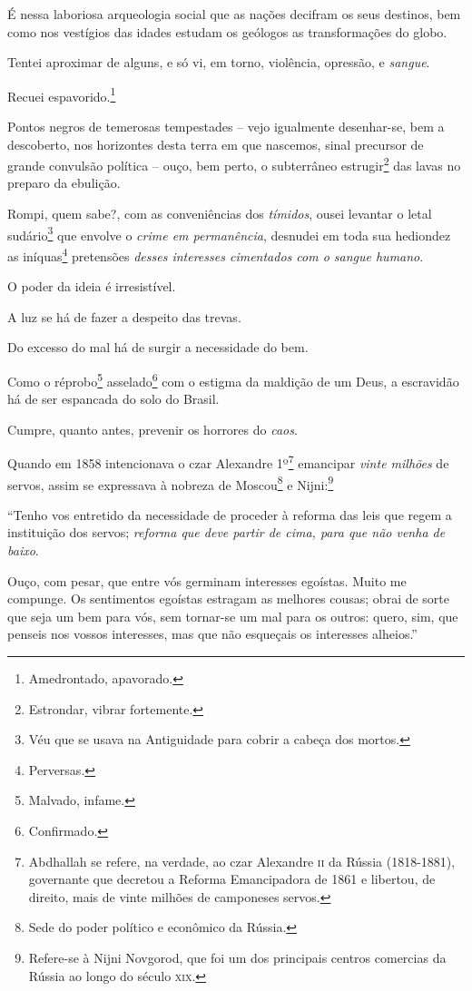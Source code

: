 É nessa laboriosa arqueologia social que as nações decifram os seus
destinos, bem como nos vestígios das idades estudam os geólogos as
transformações do globo.

Tentei aproximar de alguns, e só vi, em torno, violência, opressão, e
\emph{sangue}.

Recuei espavorido.\footnote{Amedrontado, apavorado.}

Pontos negros de temerosas tempestades -- vejo igualmente desenhar-se,
bem a descoberto, nos horizontes desta terra em que nascemos, sinal
precursor de grande convulsão política -- ouço, bem perto, o subterrâneo
estrugir\footnote{Estrondar, vibrar fortemente.} das lavas no preparo
da ebulição.

Rompi, quem sabe?, com as conveniências dos \emph{tímidos}, ousei
levantar o letal sudário\footnote{Véu que se usava na Antiguidade para
  cobrir a cabeça dos mortos.} que envolve o \emph{crime em
permanência}, desnudei em toda sua hediondez as iníquas\footnote{
  Perversas.} pretensões \emph{desses interesses cimentados com o sangue
humano}.

O poder da ideia é irresistível.

A luz se há de fazer a despeito das trevas.

Do excesso do mal há de surgir a necessidade do bem.

Como o réprobo\footnote{Malvado, infame.} asselado\footnote{
  Confirmado.} com o estigma da maldição de um Deus, a escravidão há de
ser espancada do solo do Brasil.

Cumpre, quanto antes, prevenir os horrores do \emph{caos}.

Quando em 1858 intencionava o czar Alexandre 1º\footnote{
  Abdhallah se refere, na verdade, ao czar Alexandre \textsc{ii} da Rússia
  (1818-1881), governante que decretou a Reforma Emancipadora de 1861 e
  libertou, de direito, mais de vinte milhões de camponeses servos.}
emancipar \emph{vinte milhões} de servos, assim se expressava à nobreza
de Moscou\footnote{Sede do poder político e econômico da Rússia.} e
Nijni:\footnote{Refere-se à Nijni Novgorod, que foi um dos principais
  centros comercias da Rússia ao longo do século \textsc{xix}.}

``Tenho vos entretido da necessidade de proceder à reforma das leis que
regem a instituição dos servos; \emph{reforma que deve partir de cima,
para que não venha de baixo}.

Ouço, com pesar, que entre vós germinam interesses egoístas. Muito me
compunge. Os sentimentos egoístas estragam as melhores cousas; obrai de
sorte que seja um bem para vós, sem tornar-se um mal para os outros:
quero, sim, que penseis nos vossos interesses, mas que não esqueçais os
interesses alheios.''

